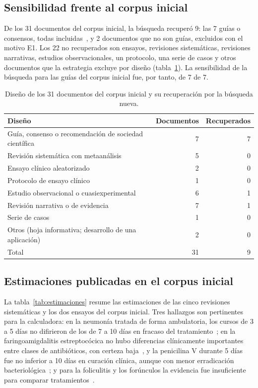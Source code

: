 \documentclass[11pt,a4paper]{article}
\begin{document}
\subsection{Sensibilidad frente al corpus inicial}

De los 31 documentos del corpus inicial, la búsqueda recuperó 9: las 7 guías o consensos, todas incluidas~\citep{castelli2025,marchisio2019,chiappini2024,backman2025,china2025,cohen2017,codepeh2019}, y 2 documentos que no son guías, excluidos con el motivo E1. Los 22 no recuperados son ensayos, revisiones sistemáticas, revisiones narrativas, estudios observacionales, un protocolo, una serie de casos y otros documentos que la estrategia excluye por diseño (tabla~\ref{tab:corpus}). La sensibilidad de la búsqueda para las guías del corpus inicial fue, por tanto, de 7 de 7.

\begin{table}[htbp]
\centering
\caption{Diseño de los 31 documentos del corpus inicial y su recuperación por la búsqueda nueva.}
\label{tab:corpus}
\small
\begin{tabular}{@{}lrr@{}}
\toprule
Diseño & Documentos & Recuperados \\
\midrule
Guía, consenso o recomendación de sociedad científica & 7 & 7 \\
Revisión sistemática con metaanálisis & 5 & 0 \\
Ensayo clínico aleatorizado & 2 & 0 \\
Protocolo de ensayo clínico & 1 & 0 \\
Estudio observacional o cuasiexperimental & 6 & 1 \\
Revisión narrativa o de evidencia & 7 & 1 \\
Serie de casos & 1 & 0 \\
Otros (hoja informativa; desarrollo de una aplicación) & 2 & 0 \\
\midrule
Total & 31 & 9 \\
\bottomrule
\end{tabular}
\end{table}

\subsection{Estimaciones publicadas en el corpus inicial}

La tabla~\ref{tab:estimaciones} resume las estimaciones de las cinco revisiones sistemáticas y los dos ensayos del corpus inicial. Tres hallazgos son pertinentes para la calculadora: en la neumonía tratada de forma ambulatoria, los cursos de 3 a 5 días no difirieron de los de 7 a 10 días en fracaso del tratamiento~\citep{kuitunen2023}; en la faringoamigdalitis estreptocócica no hubo diferencias clínicamente importantes entre clases de antibióticos, con certeza baja~\citep{hedin2023}, y la penicilina V durante 5 días fue no inferior a 10 días en curación clínica, aunque con menor erradicación bacteriológica~\citep{skoog2019}; y para la foliculitis y los forúnculos la evidencia fue insuficiente para comparar tratamientos~\citep{lin2021}.
\end{document}
